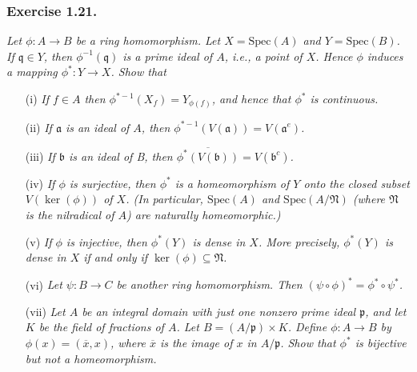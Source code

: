 \documentclass{article}
\begin{document}
\subsubsection*{Exercise 1.21.}
\emph{Let $\phi: A \to B$ be a ring homomorphism.
Let $X = \mathrm{Spec}(A)$ and  $Y = \mathrm{Spec}(B)$.
If $\mathfrak{q} \in Y$, then $\phi^{-1}(\mathfrak{q})$ is a prime ideal of $A$, i.e., a point of $X$.
Hence $\phi$ induces a mapping $\phi^{*}: Y \to X$. Show that}
\begin{enumerate}
\item[(i)]
  \emph{If $f \in A$ then $\phi^{*-1}(X_f) = Y_{\phi(f)}$, and hence that $\phi^{*}$ is continuous.}

\item[(ii)]
  \emph{If $\mathfrak{a}$ is an ideal of $A$,
  then $\phi^{*-1}(V(\mathfrak{a})) = V(\mathfrak{a}^{e})$.}

\item[(iii)]
  \emph{If $\mathfrak{b}$ is an ideal of B,
  then $\overline{\phi^{*}(V(\mathfrak{b}))} = V(\mathfrak{b}^{c})$.}

\item[(iv)]
  \emph{If $\phi$ is surjective,
  then $\phi^{*}$ is a homeomorphism of $Y$
  onto the closed subset $V(\ker(\phi))$ of $X$.
  (In particular, $\mathrm{Spec}(A)$ and $\mathrm{Spec}(A/\mathfrak{N})$
  (where $\mathfrak{N}$ is the nilradical of $A$) are naturally homeomorphic.)}

\item[(v)]
  \emph{If $\phi$ is injective,
  then $\phi^{*}(Y)$ is dense in $X$.
  More precisely, $\phi^{*}(Y)$ is dense in $X$ if and only if $\ker(\phi) \subseteq \mathfrak{N}$.}

\item[(vi)]
  \emph{Let $\psi: B \to C$ be another ring homomorphism.
  Then $(\psi \circ \phi)^{*} = \phi^{*} \circ \psi^{*}$.}

\item[(vii)]
  \emph{Let $A$ be an integral domain with just one nonzero prime ideal $\mathfrak{p}$,
  and let $K$ be the field of fractions of $A$.
  Let $B = (A/\mathfrak{p}) \times K$.
  Define $\phi: A \to B$ by $\phi(x) = (\overline{x}, x)$,
  where $\overline{x}$ is the image of $x$ in $A/\mathfrak{p}$.
  Show that $\phi^{*}$ is bijective but not a homeomorphism.} \\
\end{enumerate}
\end{document}
